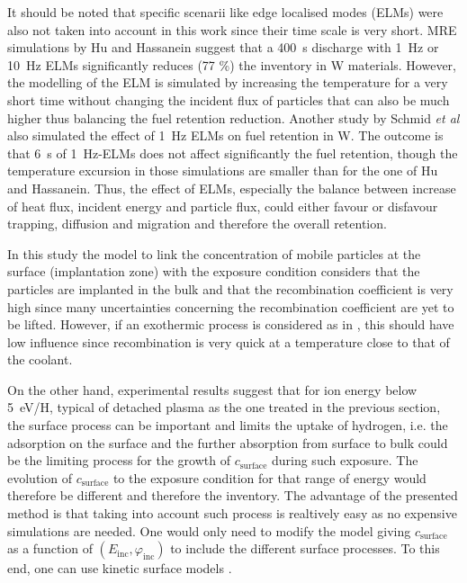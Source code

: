 It should be noted that specific scenarii like edge localised modes (ELMs) were also not taken into account in this work since their time scale is very short.
MRE simulations by Hu and Hassanein \cite{hu_predicting_2015} suggest that a \SI{400}{s} discharge with \SI{1}{Hz} or \SI{10}{Hz} ELMs significantly reduces (77 \%) the inventory in W materials.
However, the modelling of the ELM is simulated by increasing the temperature for a very short time without changing the incident flux of particles that can also be much higher thus balancing the fuel retention reduction.
Another study by Schmid \textit{et al} \cite{schmid_diffusion-trapping_2016} also simulated the effect of \SI{1}{Hz} ELMs on fuel retention in W.
The outcome is that \SI{6}{s} of \SI{1}{Hz}-ELMs does not affect significantly the fuel retention, though the temperature excursion in those simulations are smaller than for the one of Hu and Hassanein.
Thus, the effect of ELMs, especially the balance between increase of heat flux, incident energy and particle flux, could either favour or disfavour trapping, diffusion and migration and therefore the overall retention.

In this study the model to link the concentration of mobile particles at the surface (implantation zone) with the exposure condition considers that the particles are implanted in the bulk and that the recombination coefficient is very high since many uncertainties concerning the recombination coefficient are yet to be lifted.
However, if an exothermic process is considered as in \cite{ogorodnikova_recombination_2019}, this should have low influence since recombination is very quick at a temperature close to that of the coolant.

On the other hand, experimental results \cite{t_hoen_strongly_2013} suggest that for ion energy below \SI{5}{eV/H}, typical of detached plasma as the one treated in the previous section, the surface process can be important and limits the uptake of hydrogen, i.e. the adsorption on the surface and the further absorption from surface to bulk could be the limiting process for the growth of $c_\mathrm{surface}$ during such exposure.
The evolution of $c_\mathrm{surface}$ to the exposure condition for that range of energy would therefore be different and therefore the inventory.
The advantage of the presented method is that taking into account such process is realtively easy as no expensive simulations are needed.
One would only need to modify the model giving $c_\mathrm{surface}$
as a function of $(E_\mathrm{inc},\varphi_\mathrm{inc})$ to include the different surface processes.
To this end, one can use kinetic surface models \cite{hodille_retention_2017, zaloznik_deuterium_2017, pecovnik_influence_2019, guterl_effects_2019}.

